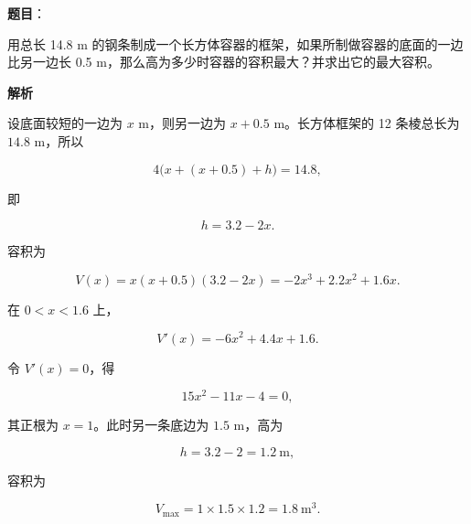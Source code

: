 \begin{answer}

\textbf{题目}：

用总长 14.8 m 的钢条制成一个长方体容器的框架，如果所制做容器的底面的一边比另一边长 0.5 m，那么高为多少时容器的容积最大？并求出它的最大容积。

\textbf{解析}

设底面较短的一边为 $x$ m，则另一边为 $x+0.5$ m。长方体框架的 12 条棱总长为 $14.8$ m，所以

\nopagebreak[4]
\[
4\bigl(x+(x+0.5)+h\bigr)=14.8,
\]

即

\nopagebreak[4]
\[
h=3.2-2x.
\]

容积为

\nopagebreak[4]
\[
V(x)=x(x+0.5)(3.2-2x)
=-2x^3+2.2x^2+1.6x.
\]

在 $0<x<1.6$ 上，

\nopagebreak[4]
\[
V'(x)=-6x^2+4.4x+1.6.
\]

令 $V'(x)=0$，得

\nopagebreak[4]
\[
15x^2-11x-4=0,
\]

其正根为 $x=1$。此时另一条底边为 $1.5$ m，高为

\nopagebreak[4]
\[
h=3.2-2=1.2\ \text{m},
\]

容积为

\nopagebreak[4]
\[
V_{\max}=1\times1.5\times1.2=1.8\ \text{m}^3.
\]


\end{answer}
